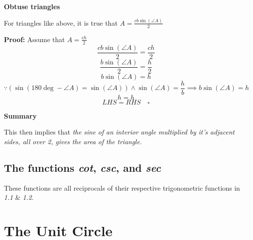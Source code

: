 \documentclass[a4paper, 12pt]{article}
\begin{document}
\begin{center}
	{\large \textbf{Obtuse triangles} } \bigbreak


\end{center}
For triangles like above, it is true that {\Large $A = \frac{cb\sin(\angle{A})}{2}$}

\begin{center}
	\textbf{Proof:}
	Assume that $A = \frac{ch}{2}$ \\
	$$\frac{cb\sin(\angle{A})}{2} = \frac{ch}{2}$$
	$$\frac{b\sin(\angle{A})}{2} = \frac{h}{2}$$
	$$b\sin(\angle{A}) = h$$
	$$\because (\sin(180\deg - \angle{A}) = \sin(\angle{A})) \land \sin(\angle{A}) = \frac{h}{b} \implies b\sin(\angle{A}) = h$$
	$$h = h$$
	$$LHS = RHS \quad \square$$
\end{center}
\newpage



{\large \textbf{Summary}} \bigbreak

This then implies that \emph{the sine of an interior angle multiplied by it's adjacent sides, all over 2, gives the area of the triangle.}

\subsection{The functions \emph{cot}, \emph{csc}, and \emph{sec}}
These functions are all reciprocals of their respective trigonometric functions in \emph{1.1} \& \emph{1.2}.

\newpage

\section{The Unit Circle}
\end{document}

